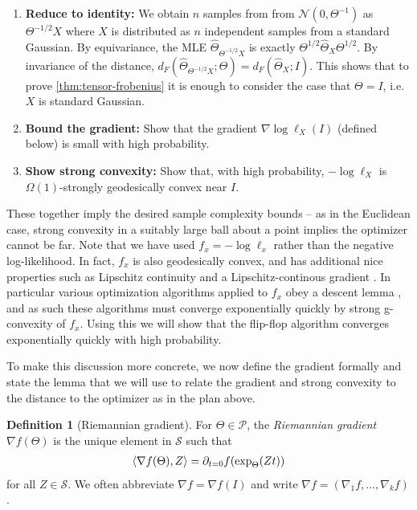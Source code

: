 \documentclass[aos]{imsart}
\theoremstyle{definition}
\newtheorem{definition}{Definition}
\newcommand{\cN}{\mathcal{N}}
\newcommand{\Sym}{\mathcal{S}}
\newcommand{\SPD}{\mathcal{P}}
\newcommand{\samp}{x}
\newcommand{\rv}{X}
\begin{document}
\begin{enumerate}
\item\label{it:reduce} \textbf{Reduce to identity:} We obtain $n$ samples from from $\cN(0, \Theta^{-1})$ as $\Theta^{-1/2} \rv$ where $\rv$ is distributed as $n$ independent samples from a standard Gaussian.
By equivariance, the MLE $\widehat{\Theta}_{\Theta^{-1/2}\rv}$ is exactly $\Theta^{1/2} \widehat\Theta_{\rv} \Theta^{1/2}$. By invariance of the distance, $d_F(\widehat\Theta_{\Theta^{-1/2} \rv}; \Theta)
= d_F(\widehat\Theta_\rv; I).$ This shows that to prove \cref{thm:tensor-frobenius} it is enough to consider the case that $\Theta = I$, i.e. $\rv$ is standard Gaussian.
\item\label{it:grad} \textbf{Bound the gradient:}
Show that the gradient $\nabla \log \ell_{\rv}(I)$ (defined below) is small with high probability.
\item\label{it:convexity} \textbf{Show strong convexity:}
Show that, with high probability, $-\log\ell_{\rv}$ is $\Omega(1)$-strongly geodesically convex near $I$.
\end{enumerate}
These together imply the desired sample complexity bounds -- as in the Euclidean case, strong convexity in a suitably large ball about a point implies the optimizer cannot be far. Note that we have used $f_\samp=-\log\ell_\samp$ rather than the negative log-likelihood. In fact, $f_\samp$ is also geodesically convex, and has additional nice properties such as Lipschitz continuity and a Lipschitz-continous gradient \cite{burgisser2019towards}. In particular various optimization algorithms applied to $f_\samp$ obey a descent lemma \cite{burgisser2017alternating}, and as such these algorithms must converge exponentially quickly by strong g-convexity of $f_\samp$. Using this we will show that the flip-flop algorithm converges exponentially quickly with high probability.

To make this discussion more concrete, we now define the gradient formally and state the lemma that we will use to relate the gradient and strong convexity to the distance to the optimizer as in the plan above.

\begin{definition}[Riemannian gradient]
For $\Theta \in \SPD$, the \emph{Riemannian gradient}~$\nabla f(\Theta)$ is the unique element in $\Sym$ such that
\begin{align*}
  \braket{\nabla f(\Theta), Z} = \partial_{t=0} f(\exp_{\Theta}(Zt))
\end{align*}
for all $Z\in \Sym$.
We often abbreviate $\nabla f = \nabla f(I)$ and write $\nabla f = (\nabla_1 f, \dots, \nabla_k f)$.
\end{definition}
\end{document}
